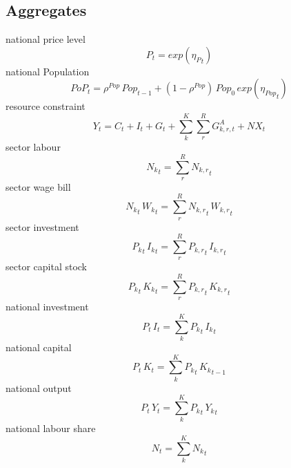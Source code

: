 \subsection{Aggregates}
national price level
\begin{dmath}
{P_{t}}=exp\left({{\eta_{P}}_{t}}\right)
\end{dmath}
national Population
\begin{dmath}
{PoP_{t}}={{\rho^{Pop}}}\, {Pop_{t-1}}+\left(1-{{\rho^{Pop}}}\right)\, {{Pop_0}}\, exp\left({{\eta_{Pop}}_{t}}\right)
\end{dmath}
resource constraint
\begin{dmath}
{Y_{t}}={C_{t}}+{I_{t}}+{G_{t}}+\sum_{k}^{K} \sum_{r}^{R} {G^{A}_{k,r,t}} + {NX_{t}}
\end{dmath}
sector labour
\begin{dmath}
{{N_k}_{t}}={\sum_{r}^{R} {N_{k,r}}_{t}}
\end{dmath}
sector wage bill
\begin{dmath}
{{N_k}_{t}}\, {{W_k}_{t}}={\sum_{r}^{R} {N_{k,r}}_{t}}\, {{W_{k,r}}_{t}}
\end{dmath}
sector investment
\begin{dmath}
{{P_k}_{t}}\, {{I_k}_{t}}={\sum_{r}^{R} {P_{k,r}}_{t}}\, {{I_{k,r}}_{t}}
\end{dmath}
sector capital stock
\begin{dmath}
{{P_k}_{t}}\, {{K_k}_{t}}={\sum_{r}^{R} {P_{k,r}}_{t}}\, {{K_{k,r}}_{t}}
\end{dmath}
national investment
\begin{dmath}
{P_{t}}\, {I_{t}}={\sum_{k}^{K} {P_k}_{t}}\, {{I_k}_{t}}
\end{dmath}
national capital
\begin{dmath}
{P_{t}}\, {K_{t}}={\sum_{k}^{K} {P_k}_{t}}\, {{K_k}_{t-1}}
\end{dmath}
national output
\begin{dmath}
{P_{t}}\, {Y_{t}}={\sum_{k}^{K} {P_k}_{t}}\, {{Y_k}_{t}}
\end{dmath}
national labour share
\begin{dmath}
{N_{t}}={\sum_{k}^{K} {N_k}_{t}}
\end{dmath}